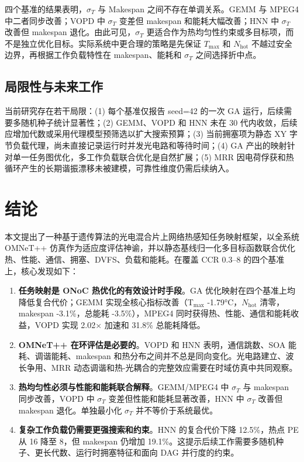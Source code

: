 \documentclass[conference]{IEEEtran}
\begin{document}
四个基准的结果表明，$\sigma_T$ 与 Makespan 之间不存在单调关系。GEMM 与 MPEG4 中二者同步改善；VOPD 中 $\sigma_T$ 变差但 makespan 和能耗大幅改善；HNN 中 $\sigma_T$ 改善但 makespan 退化。由此可见，$\sigma_T$ 更适合作为热均匀性约束或多目标项，而不是独立优化目标。实际系统中更合理的策略是先保证 $T_{\max}$ 和 $N_{\text{hot}}$ 不越过安全边界，再根据工作负载特性在 makespan、能耗和 $\sigma_T$ 之间选择折中点。

\subsection{局限性与未来工作}

当前研究存在若干局限：(1) 每个基准仅报告 seed=42 的一次 GA 运行，后续需要多随机种子统计显著性；(2) GEMM、VOPD 和 HNN 未在 30 代内收敛，后续应增加代数或采用代理模型预筛选以扩大搜索预算；(3) 当前拥塞项为静态 XY 字节负载代理，尚未直接记录运行时并发光电路和等待时间；(4) GA 产出的映射针对单一任务图优化，多工作负载联合优化是自然扩展；(5) MRR 因电荷俘获和热循环产生的长期谐振漂移未被建模，可靠性维度仍需后续纳入。

\section{结论}

本文提出了一种基于遗传算法的光电混合片上网络热感知任务映射框架，以全系统 OMNeT++ 仿真作为适应度评估神谕，并以静态基线归一化多目标函数联合优化热、性能、通信、拥塞、DVFS、负载和能耗。在覆盖 CCR 0.3--8 的四个基准上，核心发现如下：

\begin{enumerate}
\item \textbf{任务映射是 ONoC 热优化的有效设计时手段}。GA 优化映射在四个基准上均降低复合代价；GEMM 实现全核心指标改善（T$_{\max}$ -1.79\si{\degreeCelsius}，$N_{\text{hot}}$ 清零，makespan -3.1\%，总能耗 -3.5\%），MPEG4 同时获得热、性能、通信和能耗收益，VOPD 实现 2.02$\times$ 加速和 31.8\% 总能耗降低。

\item \textbf{OMNeT++ 在环评估是必要的}。VOPD 和 HNN 表明，通信跳数、SOA 能耗、调谐能耗、makespan 和热分布之间并不总是同向变化。光电路建立、波长争用、MRR 动态调谐和热-光耦合的完整效应需要在时域仿真中共同观察。

\item \textbf{热均匀性必须与性能和能耗联合解释}。GEMM/MPEG4 中 $\sigma_T$ 与 makespan 同步改善，VOPD 中 $\sigma_T$ 变差但性能和能耗显著改善，HNN 中 $\sigma_T$ 改善但 makespan 退化。单独最小化 $\sigma_T$ 并不等价于系统最优。

\item \textbf{复杂工作负载仍需要更强搜索和约束}。HNN 的复合代价下降 12.5\%，热点 PE 从 16 降至 8，但 makespan 仍增加 19.1\%。这提示后续工作需要多随机种子、更长代数、运行时拥塞特征和面向 DAG 并行度的约束。
\end{enumerate}
\end{document}

